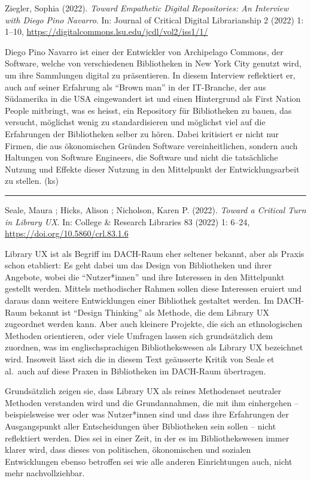 \documentclass[a4paper,
fontsize=11pt,
oneside,
numbers=noperiodatend,
parskip=half-,
bibliography=totoc,
final
]{scrartcl}
\begin{document}
Ziegler, Sophia (2022). \emph{Toward Empathetic Digital Repositories: An
Interview with Diego Pino Navarro}. In: Journal of Critical Digital
Librarianship 2 (2022) 1: 1--10,
\url{https://digitalcommons.lsu.edu/jcdl/vol2/iss1/1/}

Diego Pino Navarro ist einer der Entwickler von Archipelago Commons, der
Software, welche von verschiedenen Bibliotheken in New York City genutzt
wird, um ihre Sammlungen digital zu präsentieren. In diesem Interview
reflektiert er, auch auf seiner Erfahrung als \enquote{Brown man} in der
IT-Branche, der aus Südamerika in die USA eingewandert ist und einen
Hintergrund als First Nation People mitbringt, was es heisst, ein
Repository für Bibliotheken zu bauen, das versucht, möglichst wenig zu
standardisieren und möglichst viel auf die Erfahrungen der Bibliotheken
selber zu hören. Dabei kritisiert er nicht nur Firmen, die aus
ökonomischen Gründen Software vereinheitlichen, sondern auch Haltungen
von Software Engineers, die Software und nicht die tatsächliche Nutzung
und Effekte dieser Nutzung in den Mittelpunkt der Entwicklungsarbeit zu
stellen. (ks)

\begin{center}\rule{0.5\linewidth}{0.5pt}\end{center}

Seale, Maura ; Hicks, Alison ; Nicholson, Karen P. (2022). \emph{Toward
a Critical Turn in Library UX}. In: College \& Research Libraries 83
(2022) 1: 6--24, \url{https://doi.org/10.5860/crl.83.1.6}

Library UX ist als Begriff im DACH-Raum eher seltener bekannt, aber als
Praxis schon etabliert: Es geht dabei um das Design von Bibliotheken und
ihrer Angebote, wobei die \enquote{Nutzer*innen} und ihre Interessen in
den Mittelpunkt gestellt werden. Mittels methodischer Rahmen sollen
diese Interessen eruiert und daraus dann weitere Entwicklungen einer
Bibliothek gestaltet werden. Im DACH-Raum bekannt ist \enquote{Design
Thinking} als Methode, die dem Library UX zugeordnet werden kann. Aber
auch kleinere Projekte, die sich an ethnologischen Methoden orientieren,
oder viele Umfragen lassen sich grundsätzlich dem zuordnen, was im
englischsprachigen Bibliothekswesen als Library UX bezeichnet wird.
Insoweit lässt sich die in diesem Text geäusserte Kritik von Seale et
al.~auch auf diese Praxen in Bibliotheken im DACH-Raum übertragen.

Grundsätzlich zeigen sie, dass Library UX als reines Methodenset
neutraler Methoden verstanden wird und die Grundannahmen, die mit ihm
einhergehen -- beispielsweise wer oder was Nutzer*innen sind und dass
ihre Erfahrungen der Ausgangspunkt aller Entscheidungen über
Bibliotheken sein sollen -- nicht reflektiert werden. Dies sei in einer
Zeit, in der es im Bibliothekswesen immer klarer wird, dass dieses von
politischen, ökonomischen und sozialen Entwicklungen ebenso betroffen
sei wie alle anderen Einrichtungen auch, nicht mehr nachvollziehbar.
\end{document}
